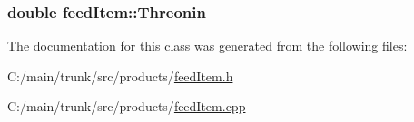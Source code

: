 \label{classfeed_item_a0c724ea2e335d283f04a717de7f3eb4d}
\hypertarget{classfeed_item_a1e32708aa4bf0d21ef5a3f7e913164d8}{
\subsubsection[{Threonin}]{\setlength{\rightskip}{0pt plus 5cm}double {\bf feedItem::Threonin}}}
\label{classfeed_item_a1e32708aa4bf0d21ef5a3f7e913164d8}


The documentation for this class was generated from the following files:\begin{DoxyCompactItemize}
\item 
C:/main/trunk/src/products/\hyperlink{feed_item_8h}{feedItem.h}\item 
C:/main/trunk/src/products/\hyperlink{feed_item_8cpp}{feedItem.cpp}\end{DoxyCompactItemize}
